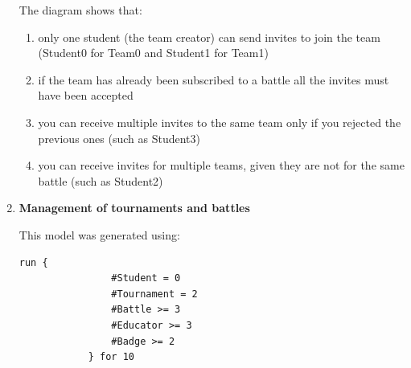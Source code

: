 \begin{enumerate}[label=,leftmargin=0cm]
          The diagram shows that:
          \begin{enumerate}
              \item only one student (the team creator) can send invites
                    to join the team (Student0 for Team0 and Student1 for Team1)
              \item if the team has already been subscribed to a battle
                    all the invites must have been accepted
              \item you can receive multiple invites to the same team only
                    if you rejected the previous ones (such as Student3)
              \item you can receive invites for multiple teams, given they are not
                    for the same battle (such as Student2)
          \end{enumerate}
          \pagebreak
    \item \textbf{Management of tournaments and battles}
          
          This model was generated using:
          \begin{lstlisting}[language=alloy]
            run {
                #Student = 0 
                #Tournament = 2
                #Battle >= 3
                #Educator >= 3
                #Badge >= 2
            } for 10
          \end{lstlisting}
          

\end{enumerate}
